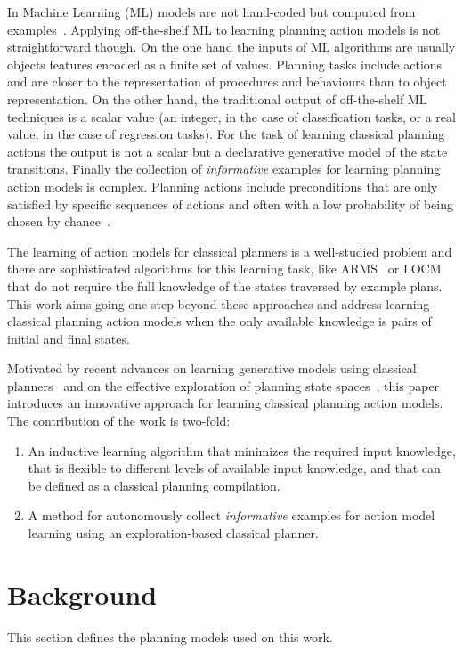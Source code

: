 \documentclass[letterpaper]{article} %
\begin{document}
In Machine Learning (ML) models are not hand-coded but computed from examples~\cite{michalski2013machine}. Applying off-the-shelf ML to learning planning action models is not straightforward though. On the one hand the inputs of ML algorithms are usually objects features encoded as a finite set of values. Planning tasks include actions and are closer to the representation of procedures and behaviours than to object representation. On the other hand, the traditional output of off-the-shelf ML techniques is a scalar value (an integer, in the case of classification tasks, or a real value, in the case of regression tasks). For the task of learning classical planning actions the output is not a scalar but a declarative generative model of the state transitions. Finally the collection of {\em informative} examples for learning planning action models is complex. Planning actions include preconditions that are only satisfied by specific sequences of actions and often with a low probability of being chosen by chance~\cite{fern2004learning}.

The learning of action models for classical planners is a well-studied problem and there are sophisticated algorithms for this learning task, like ARMS~\cite{yang2007learning} or LOCM~\cite{cresswell2013acquiring} that do not require the full knowledge of the states traversed by example plans. This work aims going one step beyond these approaches and address learning classical planning action models when the only available knowledge is pairs of initial and final states.

Motivated by recent advances on learning generative models using classical planners~\cite{segovia2017generating} and on the effective exploration of planning state spaces~\cite{geffner:novelty:IJCAI17}, this paper introduces an innovative approach for learning classical planning action models. The contribution of the work is two-fold:
\begin{enumerate}
\item An inductive learning algorithm that minimizes the required input knowledge, that is flexible to different levels of available input knowledge, and that can be defined as a classical planning compilation. 
\item A method for autonomously collect {\em informative} examples for action model learning using an exploration-based classical planner.
\end{enumerate}


\section{Background}
This section defines the planning models used on this work.
\end{document}
